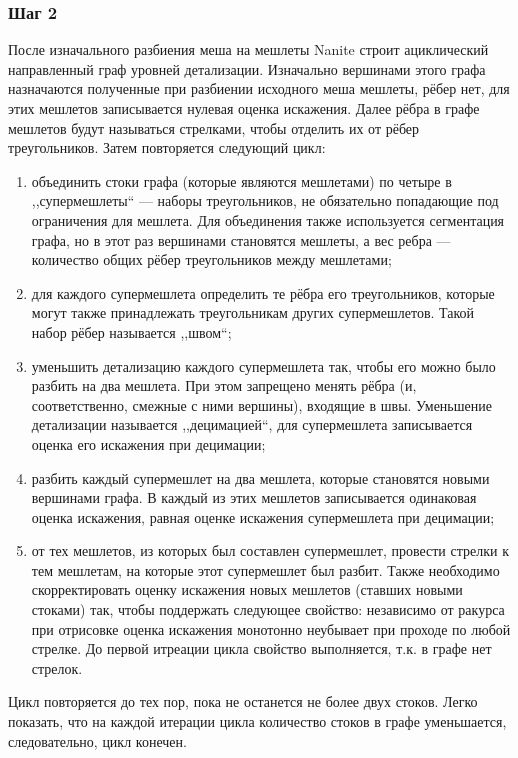 \subsubsection*{Шаг 2}
После изначального разбиения меша на мешлеты Nanite строит ациклический направленный граф уровней детализации.
Изначально вершинами этого графа назначаются полученные при разбиении исходного меша мешлеты, рёбер нет, для этих мешлетов записывается нулевая оценка искажения.
Далее рёбра в графе мешлетов будут называться стрелками, чтобы отделить их от рёбер треугольников.
Затем повторяется следующий цикл:
\begin{enumerate}
    \item объединить стоки графа (которые являются мешлетами) по четыре в ,,супермешлеты`` --- наборы треугольников, не обязательно попадающие под ограничения для мешлета.
    Для объединения также используется сегментация графа, но в этот раз вершинами  становятся мешлеты, а вес ребра --- количество общих рёбер треугольников между мешлетами;
    \item для каждого супермешлета определить те рёбра его треугольников, которые могут также принадлежать треугольникам других супермешлетов.
    Такой набор рёбер называется ,,швом``;
    \item уменьшить детализацию каждого супермешлета так, чтобы его можно было разбить на два мешлета.
    При этом запрещено менять рёбра (и, соответственно, смежные с ними вершины), входящие в швы.
    Уменьшение детализации называется ,,децимацией``, для супермешлета записывается оценка его искажения при децимации;
    \item разбить каждый супермешлет на два мешлета, которые становятся новыми вершинами графа.
    В каждый из этих мешлетов записывается одинаковая оценка искажения, равная оценке искажения супермешлета при децимации;
    \item от тех мешлетов, из которых был составлен супермешлет, провести стрелки к тем мешлетам, на которые этот супермешлет был разбит.
    Также необходимо скорректировать оценку искажения новых мешлетов (ставших новыми стоками) так, чтобы поддержать следующее свойство: независимо от ракурса при отрисовке оценка искажения монотонно неубывает при проходе по любой стрелке.
    До первой итреации цикла свойство выполняется, т.к. в графе нет стрелок.
\end{enumerate}
Цикл повторяется до тех пор, пока не останется не более двух стоков.
Легко показать, что на каждой итерации цикла количество стоков в графе уменьшается, следовательно, цикл конечен.

